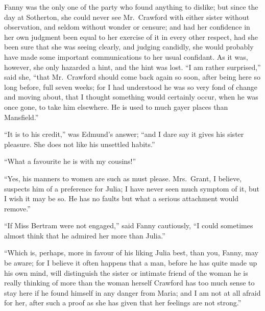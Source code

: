 Fanny was the only one of the party who found anything
to dislike; but since the day at Sotherton, she could never
see Mr.\ Crawford with either sister without observation,
and seldom without wonder or censure; and had her
confidence in her own judgment been equal to her exercise
of it in every other respect, had she been sure that she
was seeing clearly, and judging candidly, she would
probably have made some important communications to her
usual confidant.  As it was, however, she only hazarded
a hint, and the hint was lost.  ``I am rather surprised,''
said she, ``that Mr.\ Crawford should come back again so soon,
after being here so long before, full seven weeks;
for I had understood he was so very fond of change and
moving about, that I thought something would certainly
occur, when he was once gone, to take him elsewhere.
He is used to much gayer places than Mansfield.''

``It is to his credit,'' was Edmund's answer; ``and I dare
say it gives his sister pleasure.  She does not like his
unsettled habits.''

``What a favourite he is with my cousins!''

``Yes, his manners to women are such as must please.
Mrs.\ Grant, I believe, suspects him of a preference for Julia;
I have never seen much symptom of it, but I wish it may
be so.  He has no faults but what a serious attachment
would remove.''

``If Miss Bertram were not engaged,'' said Fanny cautiously,
``I could sometimes almost think that he admired her more
than Julia.''

``Which is, perhaps, more in favour of his liking
Julia best, than you, Fanny, may be aware; for I believe
it often happens that a man, before he has quite made up
his own mind, will distinguish the sister or intimate
friend of the woman he is really thinking of more than
the woman herself Crawford has too much sense to stay
here if he found himself in any danger from Maria;
and I am not at all afraid for her, after such a proof
as she has given that her feelings are not strong.''

